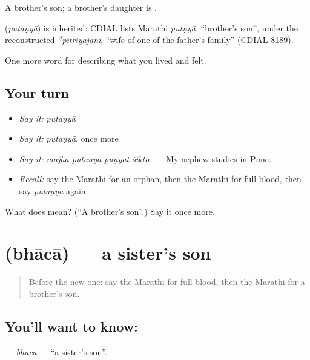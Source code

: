 A brother's son; a brother's daughter is .

\begin{cousinweb}
\textbf{} (\emph{putaṇyā}) is inherited: CDIAL lists Marathi \emph{putṇyā}, \textquotedblleft{}brother's son\textquotedblright{}, under the reconstructed \emph{*pitriyajāni}, \textquotedblleft{}wife of one of the father's family\textquotedblright{} (CDIAL 8189).
\end{cousinweb}

\begin{grammarlens}[title={What you've built}]
One more word for describing what you lived and felt.
\end{grammarlens}

\subsection*{Your turn}
\begin{itemize}
\raggedright
  \item \emph{Say it:} \emph{putaṇyā}
  \item \emph{Say it:} \emph{putaṇyā}, once more
  \item \emph{Say it:} \emph{mājhā putaṇyā puṇyāt śikto.} — My nephew studies in Pune.
  \item \emph{Recall:} say the Marathi for an orphan, then the Marathi for full-blood, then say \emph{putaṇyā} again
\end{itemize}

\begin{tcolorbox}[breakable,colback=teal!4,colframe=teal!35!black,title={Before you move on}]
What does  mean? (\textquotedblleft{}A brother's son\textquotedblright{}.) Say it once more.
\end{tcolorbox}
\section[\texorpdfstring{\mr{भाचा} (bhācā)}{भाचा (bhācā)}]{ (bhācā) — a sister's son}

\label{lesson:MR-C495-bhaca}



\begin{quote}
Before the new one: say the Marathi for full-blood, then the Marathi for a brother's son.
\end{quote}

\subsection*{You'll want to know: }
\textbf{} — \emph{bhācā} — \textquotedblleft{}a sister's son\textquotedblright{}.

